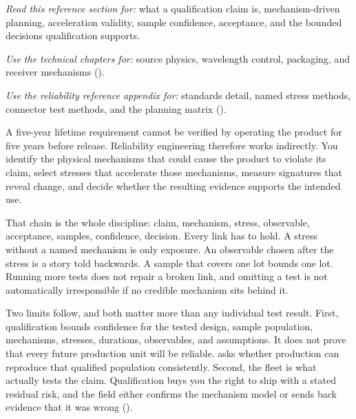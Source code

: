 

\textit{Read this reference section for:} what a qualification claim is, mechanism-driven
planning, acceleration validity, sample confidence, acceptance, and the bounded
decisions qualification supports.

\textit{Use the technical chapters for:} source physics, wavelength control,
packaging, and receiver mechanisms
().

\textit{Use the reliability reference appendix for:} standards detail, named
stress methods, connector test methods, and the planning matrix
().

A five-year lifetime requirement cannot be verified by operating the product
for five years before release. Reliability engineering therefore works
indirectly. You identify the physical mechanisms that could cause the product
to violate its claim, select stresses that accelerate those mechanisms, measure
signatures that reveal change, and decide whether the resulting evidence
supports the intended use.

That chain is the whole discipline: claim, mechanism, stress, observable,
acceptance, samples, confidence, decision. Every link has to hold. A stress
without a named mechanism is only exposure. An observable chosen after the
stress is a story told backwards. A sample that covers one lot bounds one lot.
Running more tests does not repair a broken link, and omitting a test is not
automatically irresponsible if no credible mechanism sits behind it.

Two limits follow, and both matter more than any individual test result. First,
qualification bounds confidence for the tested design, sample population,
mechanisms, stresses, durations, observables, and assumptions. It does not
prove that every future production unit will be reliable.
 asks whether production can reproduce that qualified
population consistently. Second, the fleet is what actually tests the claim.
Qualification buys you the right to ship with a stated residual risk, and the
field either confirms the mechanism model or sends back evidence that it was
wrong ().

